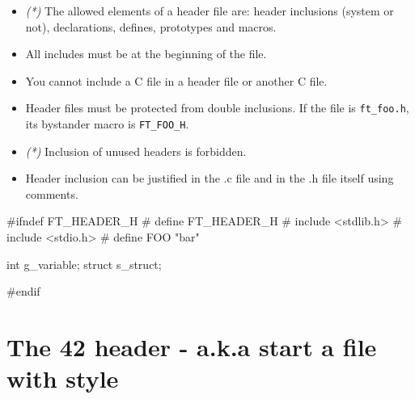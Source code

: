\documentclass{42-en}
\begin{document}
        \begin{itemize}

            \item \textit{(*)} The allowed elements of a header file are:
                header inclusions (system or not), declarations, defines,
                prototypes and macros.

            \item All includes must be at the beginning of the file.

            \item You cannot include a C file in a header file or another C file.

            \item Header files must be protected from double inclusions. If the file is
            \texttt{ft\_foo.h}, its bystander macro is \texttt{FT\_FOO\_H}.

            \item \textit{(*)} Inclusion of unused headers is forbidden.

            \item Header inclusion can be justified in the .c file and in the .h file itself
              using comments.

        \end{itemize}

\vspace{1cm}
        
        \begin{42ccode}
#ifndef FT_HEADER_H
# define FT_HEADER_H
# include <stdlib.h>
# include <stdio.h>
# define FOO "bar"

int     g_variable;
struct s_struct;

#endif
        \end{42ccode}
        \newpage



   \section{The 42 header - a.k.a start a file with style}
\end{document}
